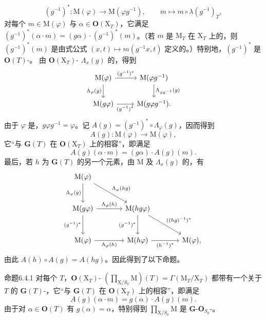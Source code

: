 \[
(g^{-1})^*:\mathrm M(\varphi)\longrightarrow\mathrm M(\varphi g^{-1}),\qquad m\longmapsto m\circ\lambda(g^{-1})_T,
\]
对每个 $m\in\mathrm M(\varphi)$ 与 $\alpha\in\mathbf O(\mathrm X_T)$，它满足 $(g^{-1})^*(\alpha\cdot m)=(g\alpha)\cdot(g^{-1})^*(m)$。（若 $m$ 是 $\mathrm M_T$ 在 $\mathrm X_T$ 上的，则 $(g^{-1})^*(m)$ 是由式公式 $(x,t)\mapsto m(g^{-1}x,t)$ 定义的。）特别地，$(g^{-1})^*$ 是 $\mathbf O(T)$-。
由 $\mathbf O(\mathrm X_T)$- $\Lambda_x(g)$ 的，得到
\[
\begin{tikzcd}
\mathrm M(\varphi)\arrow[r,"{(g^{-1})^*}"]\arrow[d,"{\Lambda_\varphi(g)}"']&\mathrm M(\varphi g^{-1})\arrow[d,"{\Lambda_{\varphi g^{-1}}(g)}"]\\
\mathrm M(g\varphi)\arrow[r,"{(g^{-1})^*}"']&\mathrm M(g\varphi g^{-1}).
\end{tikzcd}
\]
由于 $\varphi$ 是，$g\varphi g^{-1}=\varphi$。记 $A(g)=(g^{-1})^*\circ\Lambda_\varphi(g)$，因而得到
\[
A(g):\mathrm M(\varphi)\longrightarrow\mathrm M(\varphi),
\]
它“与 $\mathbf G(T)$ 在 $\mathbf O(\mathrm X_T)$ 上的相容”，即满足
\[
A(g)(\alpha\cdot m)=(g\alpha)\cdot A(g)(m).
\]
最后，若 $h$ 为 $\mathbf G(T)$ 的另一个元素，由 $\mathrm M$ 及 $\Lambda_x(g)$ 的，有
\[
\begin{tikzcd}[column sep=large,row sep=large]
\mathrm M(\varphi)\arrow[d,"{\Lambda_\varphi(g)}"']\arrow[dr,"{\Lambda_\varphi(hg)}"]&&\\
\mathrm M(g\varphi)\arrow[r,"{\Lambda_\varphi(h)}"]\arrow[d,"{(g^{-1})^*}"']&\mathrm M(hg\varphi)\arrow[d,"{(g^{-1})^*}"']\arrow[dr,"{((hg)^{-1})^*}"]&\\
\mathrm M(\varphi)\arrow[r,"{\Lambda_\varphi(h)}"']&\mathrm M(h\varphi)\arrow[r,"{(h^{-1})^*}"']&\mathrm M(\varphi),
\end{tikzcd}
\]
由此 $A(h)\circ A(g)=A(hg)$。因此得到了以下命题。
\begin{SGAresult}{命题}{6.4.1}
对每个 $T$，$\mathbf O(\mathrm X_T)$- $(\prod_{\mathrm X/S_0}\mathrm M)(T)=\Gamma(\mathrm M_T/\mathrm X_T)$ 都带有一个关于 $T$ 的 $\mathbf G(T)$-，它“与 $\mathbf G(T)$ 在 $\mathbf O(\mathrm X_T)$ 上的相容”，即满足
\[
A(g)(\alpha\cdot m)=g(\alpha)\cdot A(g)(m).
\]
由于对 $\alpha\in\mathbf O(T)$ 有 $g(\alpha)=\alpha$，特别得到 $\prod_{\mathrm X/S_0}\mathrm M$ 是 $\mathbf G$-$\mathbf O_{S_0}$-。
\end{SGAresult}
